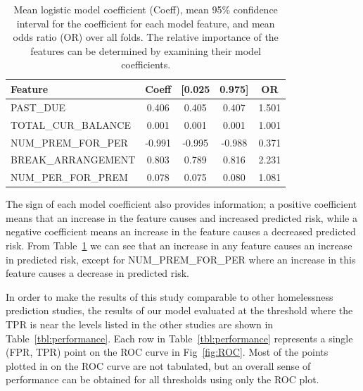 \documentclass[10pt,letterpaper]{article}
\begin{document}
\begin{table}[!h]
    \begin{tabular}{lcccc}
    \toprule
    Feature &                    Coeff &       [0.025 &       0.975] &  OR \\
    \midrule
             PAST\_DUE &         0.406 &        0.405 &        0.407 &    1.501 \\
    TOTAL\_CUR\_BALANCE &        0.001 &        0.001 &        0.001 &    1.001 \\
     NUM\_PREM\_FOR\_PER &      -0.991 &       -0.995 &       -0.988 &    0.371 \\
    BREAK\_ARRANGEMENT &         0.803 &        0.789 &        0.816 &    2.231 \\
     NUM\_PER\_FOR\_PREM &       0.078 &        0.075 &        0.080 &    1.081 \\
    \bottomrule
    \end{tabular}
    \caption{Mean logistic model coefficient (Coeff), mean 95\% confidence interval for the coefficient for each model feature, and mean odds ratio (OR) over all folds. The relative importance of the features can be determined by examining their model coefficients.}
    \label{tbl:meanParams}
\end{table}

The sign of each model coefficient also provides information; a positive coefficient means that an increase in the feature causes and increased predicted risk, while a negative coefficient means an increase in the feature causes a decreased predicted risk. From Table~\ref{tbl:meanParams} we can see that an increase in any feature causes an increase in predicted risk, except for NUM\_PREM\_FOR\_PER where an increase in this feature causes a decrease in predicted risk.

In order to make the results of this study comparable to other homelessness prediction studies, the results of our model evaluated at the threshold where the TPR is near the levels listed in the other studies are shown in Table~\ref{tbl:performance}. Each row in Table~\ref{tbl:performance} represents a single (FPR, TPR) point on the ROC curve in Fig~\ref{fig:ROC}. Most of the points plotted in on the ROC curve are not tabulated, but an overall sense of performance can be obtained for all thresholds using only the ROC plot.
\end{document}
